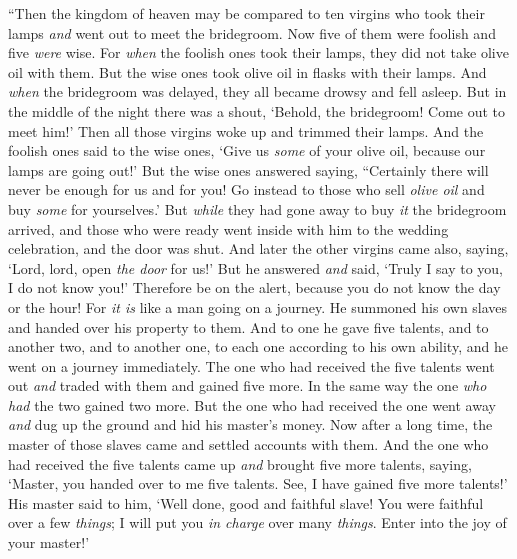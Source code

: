 \begin{biblechapter} %
 “Then the kingdom of heaven may be compared to ten virgins who took their lamps \textit{and} went out to meet the bridegroom.
\verse Now five of them were foolish and five \textit{were} wise.
\verse For \textit{when} the foolish ones took their lamps, they did not take olive oil with them.
\verse But the wise ones took olive oil in flasks with their lamps.
\verse And \textit{when} the bridegroom was delayed, they all became drowsy and fell asleep.
\verse But in the middle of the night there was a shout, ‘Behold, the bridegroom! Come out to meet him!’
\verse Then all those virgins woke up and trimmed their lamps.
\verse And the foolish ones said to the wise ones, ‘Give us \textit{some} of your olive oil, because our lamps are going out!’
\verse But the wise ones answered saying, “Certainly there will never be enough for us and for you! Go instead to those who sell \textit{olive oil} and buy \textit{some} for yourselves.’
\verse But \textit{while} they had gone away to buy \textit{it} the bridegroom arrived, and those who were ready went inside with him to the wedding celebration, and the door was shut.
\verse And later the other virgins came also, saying, ‘Lord, lord, open \textit{the door} for us!’
\verse But he answered \textit{and} said, ‘Truly I say to you, I do not know you!’
\verse Therefore be on the alert, because you do not know the day or the hour!
 For \textit{it is} like a man going on a journey. He summoned his own slaves and handed over his property to them.
\verse And to one he gave five talents, and to another two, and to another one, to each one according to his own ability, and he went on a journey immediately.
\verse The one who had received the five talents went out \textit{and} traded with them and gained five more.
\verse In the same way the one \textit{who had} the two gained two more.
\verse But the one who had received the one went away \textit{and} dug up the ground and hid his master’s money.
\verse Now after a long time, the master of those slaves came and settled accounts with them.
\verse And the one who had received the five talents came up \textit{and} brought five more talents, saying, ‘Master, you handed over to me five talents. See, I have gained five more talents!’
\verse His master said to him, ‘Well done, good and faithful slave! You were faithful over a few \textit{things}; I will put you \textit{in charge} over many \textit{things}. Enter into the joy of your master!’

\end{biblechapter}
